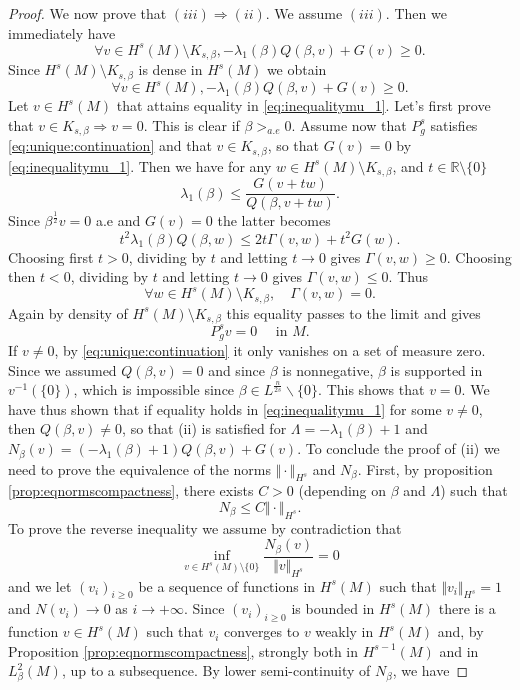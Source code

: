 \documentclass[10pt]{amsart}
\numberwithin{equation}{section}
\newcommand{\R}{\mathbb{R}}
\theoremstyle{plain}
\theoremstyle{remark}
\begin{document}
\begin{proof}
\medskip

We now prove that $(iii)\Rightarrow (ii)$. We assume $(iii)$.
Then we immediately have
$$\forall v \in H^s(M) \setminus K_{s,\beta}, -\lambda_1(\beta)Q(\beta,v) + G(v) \geq 0. $$
Since $H^s(M) \setminus K_{s,\beta}$ is dense in $H^s(M)$ we obtain
\begin{equation} \label{eq:inequalitymu_1} \forall v \in H^s(M), -\lambda_1(\beta) Q(\beta,v) + G(v) \geq 0.  \end{equation}
Let $v \in H^s(M)$ that attains equality in \eqref{eq:inequalitymu_1}. Let's first prove that $v \in K_{s,\beta} \Rightarrow v=0$. This is clear if $\beta>_{a.e}0$. Assume now that $P_g^s$ satisfies \eqref{eq:unique:continuation} and that $v \in K_{s,\beta}$, so that $G(v) = 0$ by \eqref{eq:inequalitymu_1}. Then we have for any $w \in H^s(M) \setminus K_{s,\beta}$, and $t \in \R\setminus \{0\}$ 
$$ \lambda_1(\beta) \leq \frac{G(v+tw)}{Q(\beta,v+tw)}. $$
Since $\beta^{\frac12}v = 0$ a.e and $G(v) = 0$ the latter becomes 
$$ t^2 \lambda_1(\beta) Q(\beta,w) \leq  2t \Gamma(v,w) + t^2 G(w). $$
Choosing first $t>0$, dividing by $t$ and letting $t\to 0$ gives $\Gamma(v,w) \ge 0$. Choosing then $t<0$, dividing by $t$ and letting $t\to 0$ gives $\Gamma(v,w) \le0$.
Thus
$$  \forall w \in H^s(M) \setminus K_{s,\beta}, \quad \Gamma(v,w) = 0 .$$
Again by density of $H^s(M) \setminus K_{s,\beta}$ this equality passes to the limit and gives 
$$ P_g^s v = 0 \quad \text{ in } M. $$
If $v \neq 0$, by \eqref{eq:unique:continuation} it only vanishes on a set of measure zero. Since we assumed $Q(\beta,v) = 0$ and since $\beta$ is nonnegative, $\beta$ is supported in $v^{-1}(\{0\})$, which is impossible since $\beta \in L^{\frac{n}{2s}} \backslash \{0\}$. This shows that $v=0$. We have thus shown that if equality holds in  \eqref{eq:inequalitymu_1} for some $v \neq 0$, then $Q(\beta,v)\neq 0$, so that (ii) is satisfied for $\Lambda = -\lambda_1(\beta)+1$ and $N_\beta(v) = (- \lambda_1(\beta)+1) Q(\beta, v) + G(v)$. To conclude the proof of (ii) we need to prove the equivalence of the norms $\Vert \cdot \Vert_{H^s}$ and $N_\beta$. First, by proposition \ref{prop:eqnormscompactness}, there exists $C>0$ (depending on $\beta$ and $\Lambda$) such that
$$ N_\beta \leq C \Vert \cdot \Vert_{H^s} . $$
To prove the reverse inequality we assume by contradiction that
$$ \inf_{v\in H^s(M)\setminus \{0\}} \frac{N_\beta(v)}{\Vert v \Vert_{H^s}} = 0$$ 
and we let $(v_i)_{i \ge0}$ be a sequence of functions in $H^s(M)$ such that $\Vert v_i \Vert_{H^s} = 1$ and $ N(v_i) \to 0$
as $i\to +\infty$. Since $(v_i)_{i\ge0}$ is bounded in $H^s(M)$ there is a function $v\in H^s(M)$ such that $v_i$ converges to $v$ weakly in $H^s(M)$ and, by Proposition \ref{prop:eqnormscompactness}, strongly both in $H^{s-1}(M)$ and in $L^2_\beta(M)$, up to a subsequence. By lower semi-continuity of $N_\beta$, we have

\end{proof}
\end{document}
